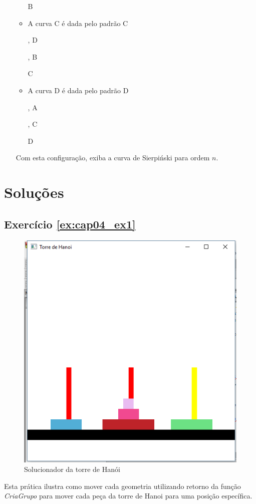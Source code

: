 \begin{enumerate}
\begin{itemize}
      B
    \item
      A curva C é dada pelo padrão C
      , D
      , B
      C
    \item
      A curva D é dada pelo padrão D
      , A
      , C
      D
  \end{itemize}
  Com esta configuração, exiba a curva de Sierpiński para ordem $n$.
  \label{ex:cap04_ex4}
\end{enumerate}

\section*{Soluções}

\subsection*{Exercício \ref{ex:cap04_ex1} }
\begin{figure}[ht]
  \centerline{\includegraphics[width=.5\textwidth]{img/cap4_ex13.png}}
  \caption{Solucionador da torre de Hanói}
  \label{fig:cap04_ex1}
\end{figure}
Esta prática ilustra como mover cada geometria utilizando retorno da função \emph{CriaGrupo} para mover cada peça da torre de Hanoi para uma posição específica.



